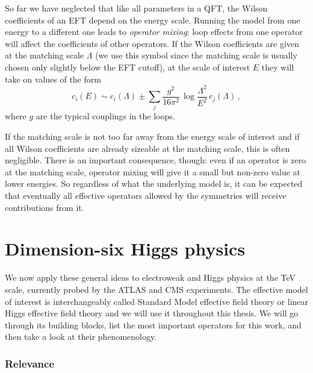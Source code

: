 So far we have neglected that like all parameters in a QFT, the Wilson
coefficients of an EFT depend on the energy scale. Running the model
from one energy to a different one leads to \emph{operator mixing}:
loop effects from one operator will affect the coefficients of other
operators. If the Wilson coefficients are given at the matching scale
$\Lambda$ (we use this symbol since the matching scale is usually
chosen only slightly below the EFT cutoff), at the scale of interest
$E$ they will take on values of the form
%
\begin{equation}
  c_i (E) \sim c_i(\Lambda) \pm \sum_j \frac {g^2} {16 \pi^2} \, \log \frac {\Lambda^2} {E^2} \,c_j(\Lambda) \,,
\end{equation}
%
where $g$ are the typical couplings in the loops.

If the matching scale is not too far away from the energy scale of
interest and if all Wilson coefficients are already sizeable at the
matching scale, this is often negligible. There is an important
consequence, though: even if an operator is zero at the matching
scale, operator mixing will give it a small but non-zero value at
lower energies. So regardless of what the underlying model is, it can
be expected that eventually all effective operators allowed by the
symmetries will receive contributions from it. 





\section{Dimension-six Higgs physics}
\label{sec:foundations_higgs_eft}

We now apply these general ideas to electroweak and Higgs physics at
the TeV scale, currently probed by the ATLAS and CMS experiments. The
effective model of interest is interchangeably called Standard Model
effective field theory or linear Higgs effective field theory and we
will use it throughout this thesis. We will go through its building
blocks, list the most important operators for this work, and then take
a look at their phenomenology.



\subsubsection*{Relevance}

